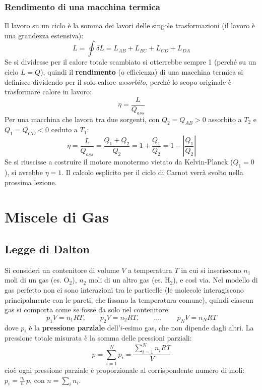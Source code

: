 \documentclass[11pt, a4paper, openright]{book}
\theoremstyle{plain}
\theoremstyle{definition}
\theoremstyle{remark}
\begin{document}
\subsection{Rendimento di una macchina termica}
Il lavoro su un ciclo è la somma dei lavori delle singole trasformazioni (il lavoro è una grandezza estensiva):
\begin{equation}
    L = \oint \delta L = L_{AB} + L_{BC} + L_{CD} + L_{DA}
\end{equation}
Se si dividesse per il calore totale scambiato si otterrebbe sempre 1 (perché su un ciclo $L = Q$), quindi il \textbf{rendimento} (o efficienza) di una macchina termica si definisce dividendo per il solo calore \emph{assorbito}, perché lo scopo originale è trasformare calore in lavoro:
\begin{equation}
    \eta = \frac{L}{Q_{ass}}
\end{equation}
Per una macchina che lavora tra due sorgenti, con $Q_2 = Q_{AB} > 0$ assorbito a $T_2$ e $Q_1 = Q_{CD} < 0$ ceduto a $T_1$:
\begin{equation}
    \boxed{\eta = \frac{L}{Q_{ass}} = \frac{Q_1 + Q_2}{Q_2} = 1 + \frac{Q_1}{Q_2} = 1 - \left|\frac{Q_1}{Q_2}\right|}
\end{equation}
Se si riuscisse a costruire il motore monotermo vietato da Kelvin-Planck ($Q_1 = 0$), si avrebbe $\eta = 1$. Il calcolo esplicito per il ciclo di Carnot verrà svolto nella prossima lezione.

\chapter{Miscele di Gas}
\section{Legge di Dalton}
Si consideri un contenitore di volume $V$ a temperatura $T$ in cui si inseriscono $n_1$ moli di un gas (es. $\text{O}_2$), $n_2$ moli di un altro gas (es. $\text{H}_2$), e così via. Nel modello di gas perfetto non ci sono interazioni tra le particelle (le molecole interagiscono principalmente con le pareti, che fissano la temperatura comune), quindi ciascun gas si comporta come se fosse da solo nel contenitore:
\begin{equation}
    p_1V = n_1RT, \qquad p_2V = n_2RT, \qquad \dots, \qquad p_NV = n_NRT
\end{equation}
dove $p_i$ è la \textbf{pressione parziale} dell'$i$-esimo gas, che non dipende dagli altri. La pressione totale misurata è la somma delle pressioni parziali:
\begin{equation}
    \boxed{p = \sum_{i = 1}^N p_i = \frac{\sum_{i = 1}^N n_iRT}{V}}
\end{equation}
cioè ogni pressione parziale è proporzionale al corrispondente numero di moli: $p_i = \frac{n_i}{n}\,p$, con $n = \sum_i n_i$.
\end{document}
